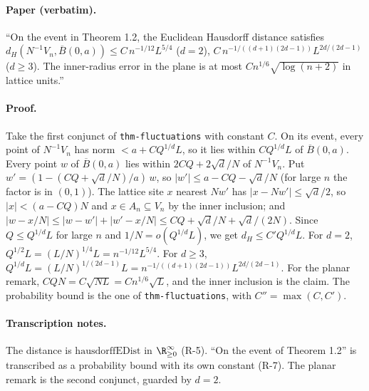 \paragraph{Paper (verbatim).} ``On the event in Theorem 1.2, the Euclidean Hausdorff distance satisfies
$d_H(N^{-1}V_n,\overline B(0,a))\leq C\,n^{-1/12}L^{5/4}$ ($d=2$), $C\,n^{-1/((d+1)(2d-1))}L^{2d/(2d-1)}$
($d\geq3$). The inner-radius error in the plane is at most $Cn^{1/6}\sqrt{\log(n+2)}$ in lattice
units.''
\paragraph{Proof.} Take the first conjunct of \texttt{thm-fluctuations} with constant $C$. On its
event, every point of $N^{-1}V_n$ has norm $<a+CQ^{1/d}L$, so it lies within $CQ^{1/d}L$ of
$\overline B(0,a)$. Every point $w$ of $\overline B(0,a)$ lies within $2CQ+2\sqrt d/N$ of
$N^{-1}V_n$. Put $w'=(1-(CQ+\sqrt d/N)/a)\,w$, so $|w'|\le a-CQ-\sqrt d/N$ (for large $n$ the
factor is in $(0,1)$). The lattice site $x$ nearest $Nw'$ has $|x-Nw'|\le\sqrt d/2$, so
$|x|<(a-CQ)N$ and $x\in A_n\subseteq V_n$ by the inner inclusion; and
$|w-x/N|\le|w-w'|+|w'-x/N|\le CQ+\sqrt d/N+\sqrt d/(2N)$. Since $Q\le Q^{1/d}L$ for large $n$ and $1/N=o(Q^{1/d}L)$, we get
$d_H\le C'Q^{1/d}L$. For $d=2$, $Q^{1/2}L=(L/N)^{1/4}L=n^{-1/12}L^{5/4}$. For $d\ge3$,
$Q^{1/d}L=(L/N)^{1/(2d-1)}L=n^{-1/((d+1)(2d-1))}L^{2d/(2d-1)}$. For the planar remark,
$CQN=C\sqrt{NL}=Cn^{1/6}\sqrt L$, and the inner inclusion is the claim. The probability bound is
the one of \texttt{thm-fluctuations}, with $C''=\max(C,C')$.
\paragraph{Transcription notes.} The distance is $\mathrm{hausdorffEDist}$ in
$\R_{\ge0}^\infty$ (R-5). ``On the event of Theorem 1.2'' is transcribed as a probability bound with
its own constant (R-7). The planar remark is the second conjunct, guarded by $d=2$.
